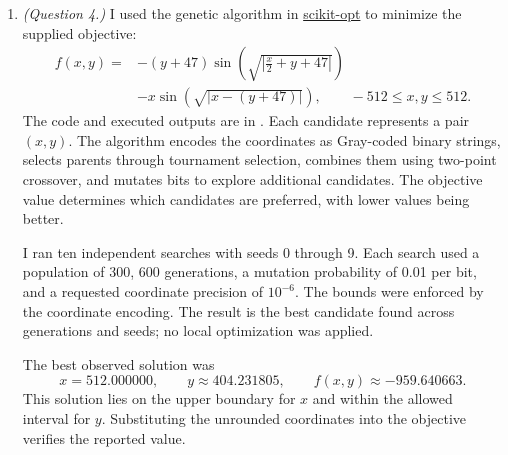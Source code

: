 \documentclass[12pt]{article}
\begin{document}
\begin{enumerate}
    \item \emph{(Question 4.)}
    I used the genetic algorithm in
    \href{https://github.com/guofei9987/scikit-opt}{scikit-opt} to minimize
    the supplied objective:
    \[
        \begin{aligned}
            f(x,y)={}&-(y+47)\sin\!\left(\sqrt{\left|\frac{x}{2}+y+47\right|}\right)\\
                    &-x\sin\!\left(\sqrt{|x-(y+47)|}\right),
            \qquad -512\leq x,y\leq512.
        \end{aligned}
    \]
    The code and executed outputs are in .
    Each candidate represents a pair $(x,y)$. The algorithm encodes the
    coordinates as Gray-coded binary strings, selects parents through
    tournament selection, combines them using two-point crossover, and
    mutates bits to explore additional candidates. The objective value
    determines which candidates are preferred, with lower values being better.

    I ran ten independent searches with seeds 0 through 9. Each search used
    a population of 300, 600 generations, a mutation probability of 0.01 per
    bit, and a requested coordinate precision of $10^{-6}$. The bounds were
    enforced by the coordinate encoding. The result is the best candidate
    found across generations and seeds; no local optimization was applied.

    The best observed solution was
    \[
        \boxed{x=512.000000,\qquad y\approx404.231805,\qquad
               f(x,y)\approx-959.640663.}
    \]
    This solution lies on the upper boundary for $x$ and within the allowed
    interval for $y$. Substituting the unrounded coordinates into the
    objective verifies the reported value.


\end{enumerate}
\end{document}
